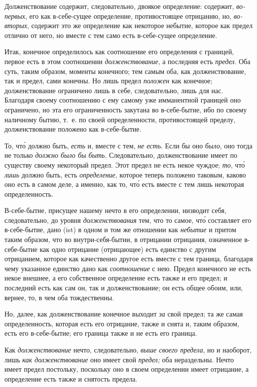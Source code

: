 Долженствование содержит, следовательно, двоякое определение: содержит,
{\em во-первых}, его как в-себе-сущее определение,
противостоящее отрицанию, но, {\em во-вторых}, содержит
это же определение как некоторое небытие, которое как предел отлично от
него, но вместе с тем само есть в-себе-сущее определение.

Итак, конечное определилось как соотношение его определения с границей,
первое есть в этом соотношении {\em долженствование}, а
последняя есть {\em предел}. Оба суть, таким образом,
моменты конечного; тем самым оба, как долженствование, так и предел, сами
конечны. Но лишь предел {\em положен} как конечное;
долженствование ограничено лишь в себе, следовательно, лишь для нас.
Благодаря своему соотношению с ему самому уже имманентной границей оно
ограничено, но эта его ограниченность закутана во в-себе-бытие, ибо по
своему наличному бытию, т.~е. по своей определенности, противостоящей
пределу, долженствование положено как в-себе-бытие.

То, чт\'{о} должно быть, {\em есть} и, вместе с тем,
{\em не есть}. Если бы оно {\em было}, оно тогда не только
{\em должно было бы быть}. Следовательно,
долженствование имеет по существу своему некоторый предел. Этот предел не
есть некое чуждое; {\em то}, чт\'{о} {\em лишь} должно быть, есть
{\em определение}, которое теперь положено таковым,
каково оно есть в самом деле, а именно, как то, чт\'{о} есть вместе с тем лишь
некоторая определенность.

В-себе-бытие, присущее нашему нечто в его определении, низводит себя,
следовательно, до уровня {\em долженствования} тем, что
то самое, чт\'{о} составляет его в-себе-бытие, дано (ist) в одном и том же
отношении как {\em небытие} и притом таким образом, что
во внутри-себя-бытии, в отрицании отрицания, означенное в-себе-бытие как
одно отрицание (отрицающее) есть единство с другим отрицанием, которое как
качественно другое есть вместе с тем граница, благодаря чему указанное
единство дано как {\em соотношение} с нею. Предел
конечного не есть некое внешнее, а его собственное определение есть также и
его предел; и последний есть как сам он, так и долженствование; он есть
общее обоим, или, вернее, то, в чем оба тождественны.

Но, далее, как долженствование конечное выходит {\em за}
свой предел; та же самая определенность, которая есть его отрицание, также
и снята и, таким образом, есть его в-себе-бытие; его граница также и не
есть его граница.

Как {\em долженствование} нечто, следовательно,
{\em выше своего предела}, но и наоборот, лишь
{\em как долженствование} оно имеет свой
{\em предел;} оба нераздельны. Нечто имеет предел
постольку, поскольку оно в своем определении имеет отрицание, а определение
есть также и снятость предела.


